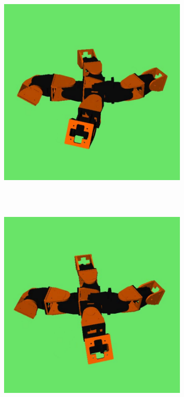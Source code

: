 \begin{figure}[h]
\begin{subfigure}[b]{0.18\textwidth}
                \includegraphics[width=\textwidth]{images/results_9_gait_02.png}
                 \\~
        \end{subfigure}
        ~
        \begin{subfigure}[b]{0.18\textwidth}
         	   \centering
                \includegraphics[width=\textwidth]{images/results_9_gait_03.png}

\end{subfigure}
\end{figure}
